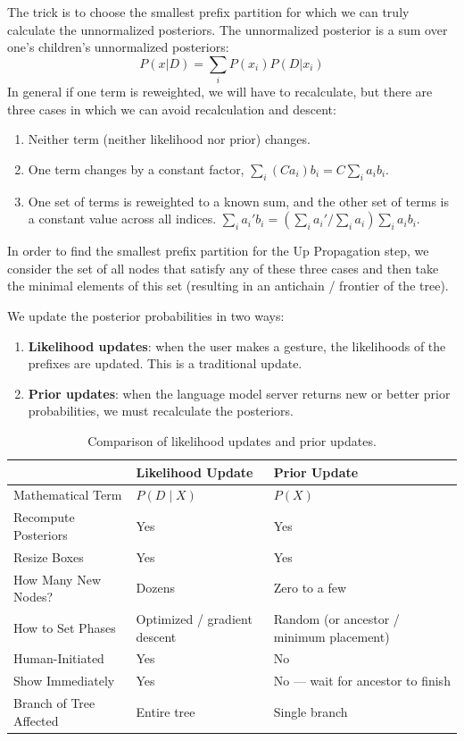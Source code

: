 The trick is to choose the smallest prefix partition for which we can truly calculate the unnormalized posteriors.
The unnormalized posterior is a sum over one's children's unnormalized posteriors:
$$
P(x|D) = \sum_i P(x_i) P(D | x_i)
$$
In general if one term is reweighted, we will have to recalculate,
but there are three cases in which we can avoid recalculation and descent:
\begin{enumerate}
    \item Neither term (neither likelihood nor prior) changes.
    \item One term changes by a constant factor, $\sum_i (Ca_i)b_i = C \sum_i a_i b_i$.
    \item One set of terms is reweighted to a known sum, and the other set of terms is a constant value across all indices.
    $\sum_i a_i' b_i = (\sum_i a_i' / \sum_i a_i) \sum_i a_i b_i$.
\end{enumerate}
In order to find the smallest prefix partition for the Up Propagation step,
we consider the set of all nodes that satisfy any of these three cases and
then take the minimal elements of this set (resulting in an antichain / frontier of the tree).

\bigskip
We update the posterior probabilities in two ways:
\begin{enumerate}
    \item \textbf{Likelihood updates}: when the user makes a gesture, the likelihoods of the prefixes are updated. This is a traditional update.
    \item \textbf{Prior updates}: when the language model server returns new or better prior probabilities, we must recalculate the posteriors.
\end{enumerate}

\begin{table}[h]
\centering
\begin{tabular}{lll}
\hline
\textbf{} & \textbf{Likelihood Update} & \textbf{Prior Update} \\
\hline
Mathematical Term       & $P(D \mid X)$                         & $P(X)$ \\
Recompute Posteriors    & Yes                                   & Yes \\
Resize Boxes            & Yes                                   & Yes \\
How Many New Nodes?     & Dozens                                & Zero to a few \\
How to Set Phases       & Optimized / gradient descent          & Random (or ancestor / minimum placement) \\
Human-Initiated         & Yes                                   & No \\
Show Immediately        & Yes                                   & No --- wait for ancestor to finish \\
Branch of Tree Affected & Entire tree                           & Single branch \\
\hline
\end{tabular}
\caption{Comparison of likelihood updates and prior updates.}
\label{tab:updates}
\end{table}


